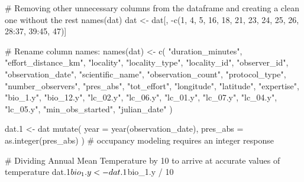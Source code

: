 \documentclass[]{article}
\newenvironment{Shaded}{}{}
\newcommand{\CommentTok}[1]{\textcolor[rgb]{0.00,0.50,0.00}{#1}}
\newcommand{\DataTypeTok}[1]{#1}
\newcommand{\DecValTok}[1]{#1}
\newcommand{\FloatTok}[1]{#1}
\newcommand{\KeywordTok}[1]{\textcolor[rgb]{0.00,0.00,1.00}{#1}}
\newcommand{\NormalTok}[1]{#1}
\newcommand{\OperatorTok}[1]{#1}
\newcommand{\StringTok}[1]{\textcolor[rgb]{0.00,0.50,0.50}{#1}}
\begin{document}
\begin{Shaded}
\begin{Highlighting}[numbers=left,,]
{{{{{\CommentTok{# Removing other unnecessary columns from the dataframe and creating a clean one without the rest}
\KeywordTok{names}\NormalTok{(dat)}
\NormalTok{dat <-}\StringTok{ }\NormalTok{dat[, }\OperatorTok{-}\KeywordTok{c}\NormalTok{(}\DecValTok{1}\NormalTok{, }\DecValTok{4}\NormalTok{, }\DecValTok{5}\NormalTok{, }\DecValTok{16}\NormalTok{, }\DecValTok{18}\NormalTok{, }\DecValTok{21}\NormalTok{, }\DecValTok{23}\NormalTok{, }\DecValTok{24}\NormalTok{, }\DecValTok{25}\NormalTok{, }\DecValTok{26}\NormalTok{, }\DecValTok{28}\OperatorTok{:}\DecValTok{37}\NormalTok{, }\DecValTok{39}\OperatorTok{:}\DecValTok{45}\NormalTok{, }\DecValTok{47}\NormalTok{)]}

\CommentTok{# Rename column names:}
\KeywordTok{names}\NormalTok{(dat) <-}\StringTok{ }\KeywordTok{c}\NormalTok{(}
  \StringTok{"duration_minutes"}\NormalTok{, }\StringTok{"effort_distance_km"}\NormalTok{, }\StringTok{"locality"}\NormalTok{,}
  \StringTok{"locality_type"}\NormalTok{, }\StringTok{"locality_id"}\NormalTok{, }\StringTok{"observer_id"}\NormalTok{,}
  \StringTok{"observation_date"}\NormalTok{, }\StringTok{"scientific_name"}\NormalTok{, }\StringTok{"observation_count"}\NormalTok{,}
  \StringTok{"protocol_type"}\NormalTok{, }\StringTok{"number_observers"}\NormalTok{, }\StringTok{"pres_abs"}\NormalTok{, }\StringTok{"tot_effort"}\NormalTok{,}
  \StringTok{"longitude"}\NormalTok{, }\StringTok{"latitude"}\NormalTok{, }\StringTok{"expertise"}\NormalTok{, }\StringTok{"bio_1.y"}\NormalTok{, }\StringTok{"bio_12.y"}\NormalTok{,}
  \StringTok{"lc_02.y"}\NormalTok{, }\StringTok{"lc_06.y"}\NormalTok{, }\StringTok{"lc_01.y"}\NormalTok{, }\StringTok{"lc_07.y"}\NormalTok{, }\StringTok{"lc_04.y"}\NormalTok{,}
  \StringTok{"lc_05.y"}\NormalTok{, }\StringTok{"min_obs_started"}\NormalTok{, }\StringTok{"julian_date"}
\NormalTok{)}

\NormalTok{dat}\FloatTok{.1}\NormalTok{ <-}\StringTok{ }\NormalTok{dat }\OperatorTok{%
\StringTok{  }\KeywordTok{mutate}\NormalTok{(}
    \DataTypeTok{year =} \KeywordTok{year}\NormalTok{(observation_date),}
    \DataTypeTok{pres_abs =} \KeywordTok{as.integer}\NormalTok{(pres_abs)}
\NormalTok{  ) }\CommentTok{# occupancy modeling requires an integer response}

\CommentTok{# Dividing Annual Mean Temperature by 10 to arrive at accurate values of temperature}
\NormalTok{dat}\FloatTok{.1}\OperatorTok{$}\NormalTok{bio_}\FloatTok{1.}\NormalTok{y <-}\StringTok{ }\NormalTok{dat}\FloatTok{.1}\OperatorTok{$}\NormalTok{bio_}\FloatTok{1.}\NormalTok{y }\OperatorTok{/}\StringTok{ }\DecValTok{10}

}}}}}}
\end{Highlighting}
\end{Shaded}
\end{document}
